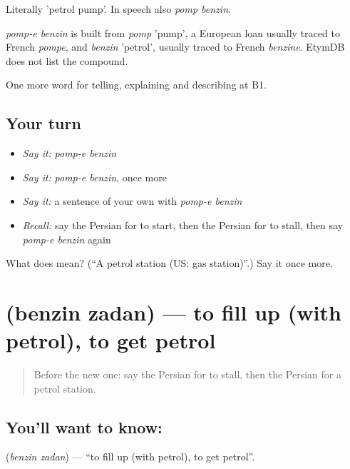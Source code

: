 Literally 'petrol pump'. In speech also \emph{pomp benzin}.

\begin{cousinweb}
\emph{pomp-e benzin} is built from \emph{pomp} 'pump', a European loan usually traced to French \emph{pompe}, and \emph{benzin} 'petrol', usually traced to French \emph{benzine}. EtymDB does not list the compound.
\end{cousinweb}

\begin{grammarlens}[title={What you've built}]
One more word for telling, explaining and describing at B1.
\end{grammarlens}

\subsection*{Your turn}
\begin{itemize}
\raggedright
  \item \emph{Say it:} \emph{pomp-e benzin}
  \item \emph{Say it:} \emph{pomp-e benzin}, once more
  \item \emph{Say it:} a sentence of your own with \emph{pomp-e benzin}
  \item \emph{Recall:} say the Persian for to start, then the Persian for to stall, then say \emph{pomp-e benzin} again
\end{itemize}

\begin{tcolorbox}[breakable,colback=teal!4,colframe=teal!35!black,title={Before you move on}]
What does   mean? (\textquotedblleft{}A petrol station (US: gas station)\textquotedblright{}.) Say it once more.
\end{tcolorbox}
\section[\texorpdfstring{\fa{بنزین} \fa{زدن} (benzin zadan)}{بنزین زدن (benzin zadan)}]{  (benzin zadan) — to fill up (with petrol), to get petrol}

\label{lesson:FA-C423-benzin-zadan}



\begin{quote}
Before the new one: say the Persian for to stall, then the Persian for a petrol station.
\end{quote}

\subsection*{You'll want to know:  }
\textbf{ } (\emph{benzin zadan}) — \textquotedblleft{}to fill up (with petrol), to get petrol\textquotedblright{}.

